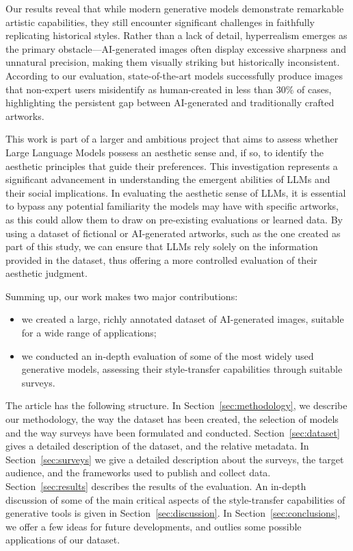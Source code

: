 \documentclass[sn-mathphys]{sn-jnl}
\begin{document}
Our results reveal that while modern generative models demonstrate remarkable artistic capabilities, they still encounter significant challenges in faithfully replicating historical styles. Rather than a lack of detail, hyperrealism emerges as the primary obstacle—AI-generated images often display excessive sharpness and unnatural precision, making them visually striking but historically inconsistent. According to our evaluation, state-of-the-art models successfully produce images that non-expert users misidentify as human-created in less than 30\% of cases, highlighting the persistent gap between AI-generated and traditionally crafted artworks.

This work is part of a larger and ambitious project that aims to assess whether Large Language Models possess an aesthetic sense and, if so, to identify the aesthetic principles that guide their preferences. This investigation represents a significant advancement in understanding the emergent abilities of LLMs \cite{emergent,emergent_mirage,loss_perspective,Angelo_TOM} and their social implications.
In evaluating the aesthetic sense of LLMs, it is essential to bypass any potential familiarity the models may have with specific artworks, as this could allow them to draw on pre-existing evaluations or learned data. By using a dataset of fictional or AI-generated artworks, such as the one created as part of this study, we can ensure that LLMs rely solely on the information provided in the dataset, thus offering a more controlled evaluation of their aesthetic judgment.

Summing up, our work makes two major contributions:
\begin{itemize}
\item we created a large, richly annotated dataset of AI-generated images, suitable for a wide range of applications;
\item we conducted an in-depth evaluation of some of the most widely used generative models, assessing their style-transfer capabilities through suitable surveys.
\end{itemize}

The article has the following structure. In Section~\ref{sec:methodology}, we describe our methodology, the way the dataset has been created, the selection of models and the way surveys have been
formulated and conducted. Section~\ref{sec:dataset} gives
a detailed description of the dataset, and the relative metadata.
In Section~\ref{sec:surveys} we give a detailed description 
about the surveys, the target audience, and the frameworks used to publish and collect data.
Section~\ref{sec:results} describes the results of the
evaluation. An in-depth discussion of some of the main critical aspects of the style-transfer capabilities of generative tools is given in Section~\ref{sec:discussion}. 
In Section~\ref{sec:conclusions}, we offer a few ideas for
future developments, and outlies some possible applications 
of our dataset.
\end{document}
